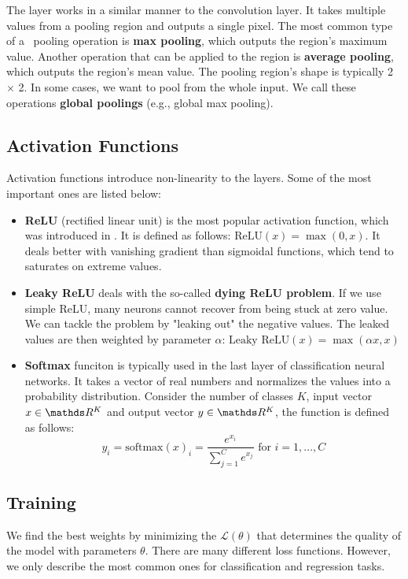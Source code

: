 The layer works in a similar manner to the convolution layer. It takes multiple
values from a pooling region and outputs a single pixel. The most common type of
a~ pooling operation is \textbf{max pooling}, which outputs the region's
maximum value. Another operation that can be applied to the region is
\textbf{average pooling}, which outputs the region's mean value. The pooling
region's shape is typically 2 $\times$ 2. In some cases, we want to
pool from the whole input. We call these operations \textbf{global poolings}
(e.g., global max pooling).

\subsection{Activation Functions}
\label{afunctions}

Activation functions introduce non-linearity to the layers. Some of the most
important ones are listed below:
\begin{itemize}
    \item \textbf{ReLU} (rectified linear unit) is the most popular activation
            function, which was introduced in \cite{pmlr-v15-glorot11a}. It is defined
            as follows: $\text{ReLU}(x) = \max(0, x)$. It deals better with vanishing
            gradient than sigmoidal functions, which tend to saturates on extreme values.
    \item \textbf{Leaky ReLU} deals with the so-called
            \textbf{dying ReLU problem}. If we use simple ReLU, many neurons cannot
            recover from being stuck at zero value. We can tackle the problem by
            "leaking out" the negative values. The leaked values are then weighted by
            parameter $\alpha$: $\text{Leaky ReLU}(x) = \max(\alpha x, x)$
    \item \textbf{Softmax} funciton is typically used in the last layer of
            classification neural networks. It takes a vector of real numbers and
            normalizes the values into a probability distribution. Consider the number of classes $K$,
            input vector$x \in \real^K$ and output vector $y \in \real^K$, the function is defined
            as follows:
            $$
                y_i = \text{softmax}(x)_i = \frac{e^{x_i}}{\sum\limits^{C}_{j = 1}
                    e^{x_j}} \text{ for } i = 1,...,C
            $$
\end{itemize}

\subsection{Training}
\label{sec:training}
We find the best weights by minimizing the  $\mathcal{L(\theta)}$
that determines the quality of the model with parameters $\theta$. There are
many different loss functions. However, we only describe the most common ones
for classification and regression tasks.

